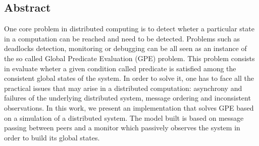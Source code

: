 \begin{titlepage}
\section*{Abstract}

One core problem in distributed computing is to detect wheter a particular state in a computation can be reached and need to be detected. Problems such as deadlocks detection, monitoring or debugging can be all seen as an instance of the so called Global Predicate Evaluation (GPE) problem. This problem consists in evaluate wheter a given condition called predicate is satisfied among the consistent global states of the system. In order to solve it, one has to face all the practical issues that may arise in a distributed computation: asynchrony and failures of the underlying distributed system, message ordering and inconsistent observations. In this work, we present an implementation that solves GPE based on a simulation of a distributed system. The model built is based on message passing between peers and a monitor which passively observes the system in order to build its global states.

\end{titlepage}
